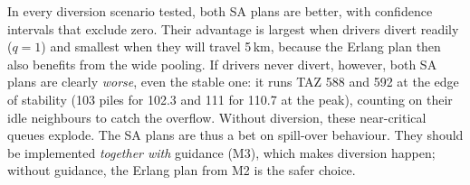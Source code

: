 \documentclass[11pt,a4paper]{article}
\begin{document}
In every diversion scenario tested, both SA plans are better, with confidence intervals that exclude zero. Their advantage is largest when drivers divert readily ($q = 1$) and smallest when they will travel 5\,km, because the Erlang plan then also benefits from the wide pooling. If drivers never divert, however, both SA plans are clearly \emph{worse}, even the stable one: it runs TAZ 588 and 592 at the edge of stability (103 piles for 102.3 and 111 for 110.7 at the peak), counting on their idle neighbours to catch the overflow. Without diversion, these near-critical queues explode. The SA plans are thus a bet on spill-over behaviour. They should be implemented \emph{together with} guidance (M3), which makes diversion happen; without guidance, the Erlang plan from M2 is the safer choice.

\end{document}
